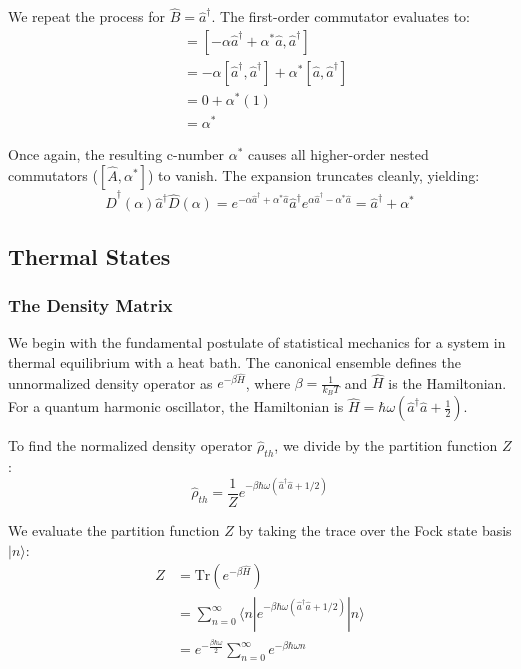 {We repeat the process for $\hat{B} = \hat{a}^{\dagger}$. The first-order commutator evaluates to:
\begin{align*}
[\hat{A},\hat{a}^{\dagger}] &= [-\alpha\hat{a}^{\dagger}+\alpha^{*}\hat{a}, \hat{a}^{\dagger}] \\
&= -\alpha[\hat{a}^{\dagger},\hat{a}^{\dagger}] + \alpha^{*}[\hat{a},\hat{a}^{\dagger}] \\
&= 0 + \alpha^{*}(1) \\
&= \alpha^{*}
\end{align*}

Once again, the resulting c-number $\alpha^{*}$ causes all higher-order nested commutators ($[\hat{A},\alpha^{*}]$) to vanish. The expansion truncates cleanly, yielding:
\begin{equation*} \hat{D}^{\dagger}(\alpha)\hat{a}^{\dagger}\hat{D}(\alpha) = e^{-\alpha\hat{a}^{\dagger}+\alpha^{*}\hat{a}}\hat{a}^{\dagger}e^{\alpha\hat{a}^{\dagger}-\alpha^{*}\hat{a}} = \hat{a}^{\dagger} + \alpha^{*} \end{equation*}
\cite[Chapter 11]{MandelWolf1995}

\subsection{Thermal States}

\subsubsection{The Density Matrix}
We begin with the fundamental postulate of statistical mechanics for a system in thermal equilibrium with a heat bath. The canonical ensemble defines the unnormalized density operator as $e^{-\beta\hat{H}}$, where $\beta = \frac{1}{k_B T}$ and $\hat{H}$ is the Hamiltonian. For a quantum harmonic oscillator, the Hamiltonian is $\hat{H} = \hbar\omega\left(\hat{a}^{\dagger}\hat{a} + \frac{1}{2}\right)$.

To find the normalized density operator $\hat{\rho}_{th}$, we divide by the partition function $Z$:
\begin{equation}
    \hat{\rho}_{th} = \frac{1}{Z} e^{-\beta\hbar\omega\left(\hat{a}^{\dagger}\hat{a} + 1/2\right)}
\end{equation}

We evaluate the partition function $Z$ by taking the trace over the Fock state basis $|n\rangle$:
\begin{align*}
    Z &= \text{Tr}\left(e^{-\beta\hat{H}}\right) \nonumber \\
      &= \sum_{n=0}^{\infty} \langle n| e^{-\beta\hbar\omega\left(\hat{a}^{\dagger}\hat{a} + 1/2\right)} |n\rangle \nonumber \\
      &= e^{-\frac{\beta\hbar\omega}{2}} \sum_{n=0}^{\infty} e^{-\beta\hbar\omega n}
\end{align*}

}
